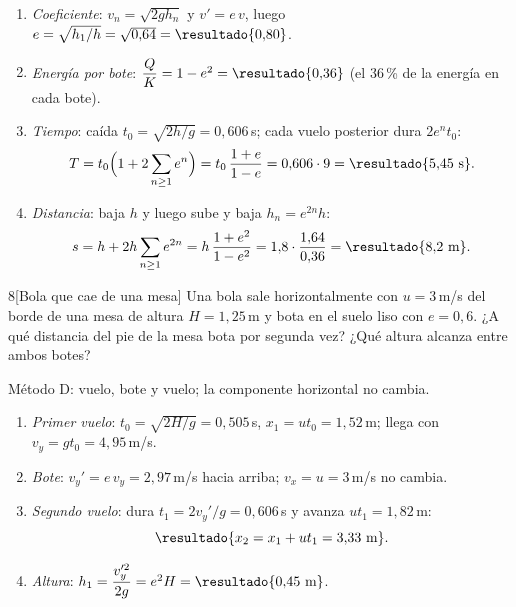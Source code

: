 \documentclass[11pt,a4paper,twoside]{article}
\newcommand{\metodo}[1]{{\color{tenue}\small\sffamily #1}\par\nopagebreak}
\begin{document}
\begin{resolucion}
\begin{enumerate}
  \item \emph{Coeficiente}: $v_{n}=\sqrt{2gh_{n}}$ y $v'=e\,v$, luego $e=\sqrt{h_{1}/h}=\sqrt{0{,}64}=\resultado{0{,}80}$.
  \item \emph{Energía por bote}: $\dfrac{Q}{K}=1-e^{2}=\resultado{0{,}36}$ (el 36\,\% de la energía en cada bote).
  \item \emph{Tiempo}: caída $t_{0}=\sqrt{2h/g}=0{,}606$\,s; cada vuelo posterior dura $2e^{n}t_{0}$:
        \[
          T=t_{0}\Bigl(1+2\sum_{n\ge1}e^{n}\Bigr)=t_{0}\,\frac{1+e}{1-e}=0{,}606\cdot9=\resultado{5{,}45\text{ s}} .
        \]
  \item \emph{Distancia}: baja $h$ y luego sube y baja $h_{n}=e^{2n}h$:
        \[
          s=h+2h\sum_{n\ge1}e^{2n}=h\,\frac{1+e^{2}}{1-e^{2}}=1{,}8\cdot\frac{1{,}64}{0{,}36}=\resultado{8{,}2\text{ m}} .
        \]
\end{enumerate}
\end{resolucion}

\begin{problema}{8}[Bola que cae de una mesa]
Una bola sale horizontalmente con $u=3$\,m/s del borde de una mesa de altura $H=1{,}25$\,m y bota
en el suelo liso con $e=0{,}6$. ¿A qué distancia del pie de la mesa bota por segunda vez? ¿Qué altura alcanza entre ambos botes?
\end{problema}
\metodo{Método D: vuelo, bote y vuelo; la componente horizontal no cambia.}

\begin{resolucion}
\begin{enumerate}
  \item \emph{Primer vuelo}: $t_{0}=\sqrt{2H/g}=0{,}505$\,s, $x_{1}=ut_{0}=1{,}52$\,m; llega con $v_{y}=gt_{0}=4{,}95$\,m/s.
  \item \emph{Bote}: $v_{y}'=e\,v_{y}=2{,}97$\,m/s hacia arriba; $v_{x}=u=3$\,m/s no cambia.
  \item \emph{Segundo vuelo}: dura $t_{1}=2v_{y}'/g=0{,}606$\,s y avanza $ut_{1}=1{,}82$\,m:
        \[
          \resultado{x_{2}=x_{1}+ut_{1}=3{,}33\text{ m}} .
        \]
  \item \emph{Altura}: $h_{1}=\dfrac{v_{y}'^{2}}{2g}=e^{2}H=\resultado{0{,}45\text{ m}}$.
\end{enumerate}
\end{resolucion}
\end{document}
